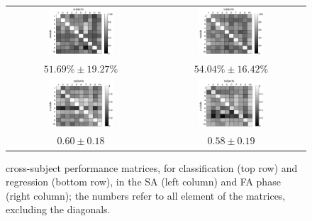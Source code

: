 \begin{figure}[!ht] \centering
  \begin{tabular}{cc}
    \includegraphics[width=0.45\textwidth]{crossClass1.eps} & \includegraphics[width=0.45\textwidth]{crossClass2.eps} \\
    $51.69\% \pm 19.27\%$ & $54.04\% \pm 16.42\%$ \\
    \includegraphics[width=0.45\textwidth]{crossRegr1.eps} & \includegraphics[width=0.45\textwidth]{crossRegr2.eps} \\
    $0.60 \pm 0.18$ & $0.58 \pm 0.19$ \\
  \end{tabular}
  \caption{cross-subject performance matrices, for classification (top
    row) and regression (bottom row), in the SA (left column)
    and FA phase (right column); the numbers refer to all element of
    the matrices, excluding the diagonals.}
  \label{fig:cross}
\end{figure}

